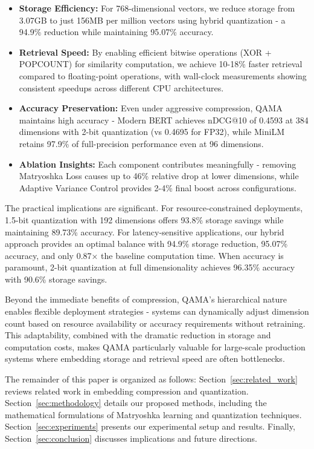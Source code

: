 \begin{itemize}
    \item \textbf{Storage Efficiency:} For 768-dimensional vectors, we reduce storage from 3.07GB to just 156MB per million vectors using hybrid quantization - a 94.9\% reduction while maintaining 95.07\% accuracy.
    
    \item \textbf{Retrieval Speed:} By enabling efficient bitwise operations (XOR + POPCOUNT) for similarity computation, we achieve 10-18\% faster retrieval compared to floating-point operations, with wall-clock measurements showing consistent speedups across different CPU architectures.
    
    \item \textbf{Accuracy Preservation:} Even under aggressive compression, QAMA maintains high accuracy - Modern BERT achieves nDCG@10 of 0.4593 at 384 dimensions with 2-bit quantization (vs 0.4695 for FP32), while MiniLM retains 97.9\% of full-precision performance even at 96 dimensions.
    
    \item \textbf{Ablation Insights:} Each component contributes meaningfully - removing Matryoshka Loss causes up to 46\% relative drop at lower dimensions, while Adaptive Variance Control provides 2-4\% final boost across configurations.
\end{itemize}

The practical implications are significant. For resource-constrained deployments, 1.5-bit quantization with 192 dimensions offers 93.8\% storage savings while maintaining 89.73\% accuracy. For latency-sensitive applications, our hybrid approach provides an optimal balance with 94.9\% storage reduction, 95.07\% accuracy, and only 0.87× the baseline computation time. When accuracy is paramount, 2-bit quantization at full dimensionality achieves 96.35\% accuracy with 90.6\% storage savings.

Beyond the immediate benefits of compression, QAMA's hierarchical nature enables flexible deployment strategies - systems can dynamically adjust dimension count based on resource availability or accuracy requirements without retraining. This adaptability, combined with the dramatic reduction in storage and computation costs, makes QAMA particularly valuable for large-scale production systems where embedding storage and retrieval speed are often bottlenecks.

The remainder of this paper is organized as follows: Section~\ref{sec:related_work} reviews related work in embedding compression and quantization. Section~\ref{sec:methodology} details our proposed methods, including the mathematical formulations of Matryoshka learning and quantization techniques. Section~\ref{sec:experiments} presents our experimental setup and results. Finally, Section~\ref{sec:conclusion} discusses implications and future directions.


